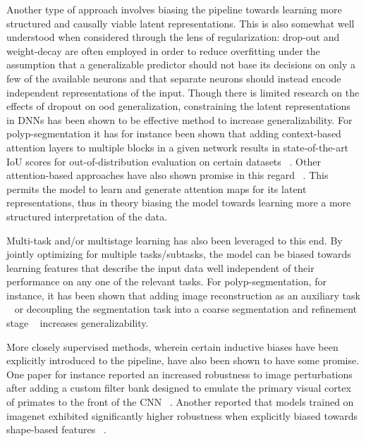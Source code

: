 Another type of approach involves biasing the pipeline towards learning more structured and causally viable latent representations. This is also somewhat well understood when considered through the lens of regularization: drop-out and weight-decay are often employed in order to reduce overfitting under the assumption that a generalizable predictor should not base its decisions on only a few of the available neurons and that separate neurons should instead encode independent representations of the input. Though there is limited research on the effects of dropout on ood generalization, constraining the latent representations in DNNs has been shown to be effective method to increase generalizability. For polyp-segmentation it has for instance been shown that adding context-based attention layers to multiple blocks in a given network results in state-of-the-art IoU scores for out-of-distribution evaluation on certain datasets ~\cite{uacanet}. Other attention-based approaches have also shown promise in this regard ~\cite{attention_generalizability, reverse_attention}. This permits the model to learn and generate attention maps for its latent representations, thus in theory biasing the model towards learning more a more structured interpretation of the data. 

Multi-task and/or multistage learning has also been leveraged to this end. By jointly optimizing for multiple tasks/subtasks, the model can be biased towards learning features that describe the input data well independent of their performance on any one of the relevant tasks. For polyp-segmentation, for instance, it has been shown that adding image reconstruction as an auxiliary task ~\cite{ddanet} or decoupling the segmentation task into a coarse segmentation and refinement stage ~\cite{doubleencdec} increases generalizability. 

More closely supervised methods, wherein certain inductive biases have been explicitly introduced to the pipeline, have also been shown to have some promise. One paper for instance reported an increased robustness to image perturbations after adding a custom filter bank designed to emulate the primary visual cortex of primates to the front of the CNN ~\cite{visual_cortex}. Another reported that models trained on imagenet exhibited significantly higher robustness when explicitly biased towards shape-based features ~\cite{texturebias}. 
	
